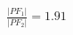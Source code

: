 \documentclass[preview]{standalone}
\begin{document}
\begin{align*}
\frac{|PF_1|}{|PF_2|} = 1.91
\end{align*}
\end{document}
